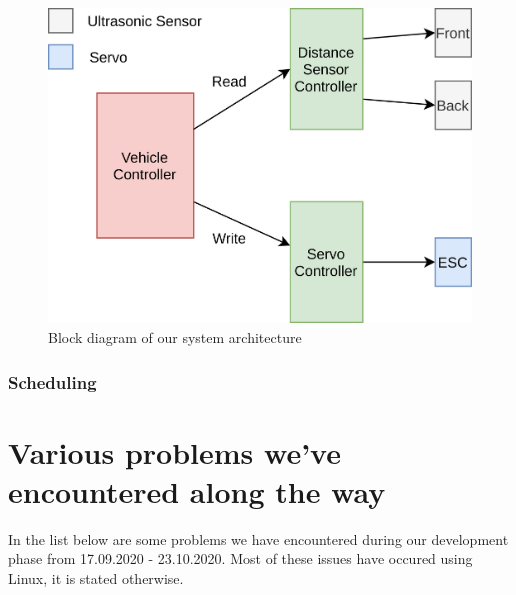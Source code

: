 \documentclass{article}
\begin{document}
\begin{figure}[H]
	\centering
	\includegraphics[width=\linewidth]{system-architecture.png}
	\caption{Block diagram of our system architecture}
	\label{SystemArchBlock}
\end{figure}

\subsubsection{Scheduling}

\section{Various problems we've encountered along the way}
In the list below are some problems we have encountered during our development phase from 17.09.2020 - 23.10.2020. Most of these issues have occured using Linux, it is stated otherwise.
\end{document}
